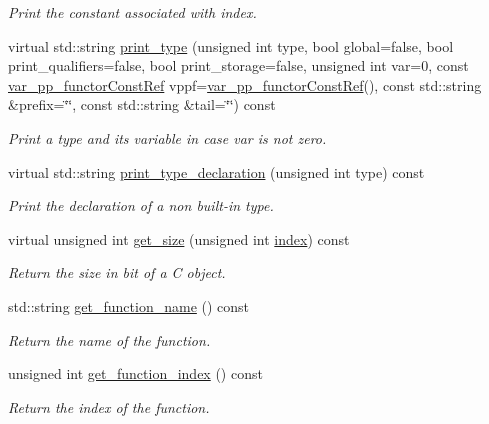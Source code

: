 \begin{DoxyCompactItemize}
\begin{DoxyCompactList}\small\item\em Print the constant associated with index. \end{DoxyCompactList}\item 
virtual std\+::string \hyperlink{classBehavioralHelper_a1a794fe146a7a2b5ab204c4819b5d94e}{print\+\_\+type} (unsigned int type, bool global=false, bool print\+\_\+qualifiers=false, bool print\+\_\+storage=false, unsigned int var=0, const \hyperlink{var__pp__functor_8hpp_a8a6b51b6519401d911398943510557f0}{var\+\_\+pp\+\_\+functor\+Const\+Ref} vppf=\hyperlink{var__pp__functor_8hpp_a8a6b51b6519401d911398943510557f0}{var\+\_\+pp\+\_\+functor\+Const\+Ref}(), const std\+::string \&prefix=\char`\"{}\char`\"{}, const std\+::string \&tail=\char`\"{}\char`\"{}) const
\begin{DoxyCompactList}\small\item\em Print a type and its variable in case var is not zero. \end{DoxyCompactList}\item 
virtual std\+::string \hyperlink{classBehavioralHelper_a9bf58062df2401ac3abb1fb4925a7d80}{print\+\_\+type\+\_\+declaration} (unsigned int type) const
\begin{DoxyCompactList}\small\item\em Print the declaration of a non built-\/in type. \end{DoxyCompactList}\item 
virtual unsigned int \hyperlink{classBehavioralHelper_a9106c1fa2b8bab1952a56c53b3e616a0}{get\+\_\+size} (unsigned int \hyperlink{tutorial__pact__2019_2Introduction_2third_2include_2Keccak_8h_a028c9bdc8344cca38ab522a337074797}{index}) const
\begin{DoxyCompactList}\small\item\em Return the size in bit of a C object. \end{DoxyCompactList}\item 
std\+::string \hyperlink{classBehavioralHelper_a7e1ca094d7e2d5b3ec825cf3a73e5f8c}{get\+\_\+function\+\_\+name} () const
\begin{DoxyCompactList}\small\item\em Return the name of the function. \end{DoxyCompactList}\item 
unsigned int \hyperlink{classBehavioralHelper_a1ce91e3194698e93726ab8cf2f427dd0}{get\+\_\+function\+\_\+index} () const
\begin{DoxyCompactList}\small\item\em Return the index of the function. \end{DoxyCompactList}\item 

\end{DoxyCompactItemize}
